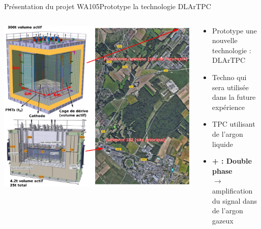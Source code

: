     \begin{frame}{Présentation du projet WA105}{Prototype la technologie DLArTPC}
        \begin{scriptsize}
            \begin{columns}
                \begin{column}{0.75\textwidth}
                    \centering
                    \includegraphics[height=0.9\textheight]{./pictures/wa105.png}
                \end{column}
                \begin{column}{0.25\textwidth}
                    \begin{itemize}
                        \item Prototype une nouvelle technologie : DLArTPC
                        \item Techno qui sera utilisée dans la future expérience \dune{} 
                        \item TPC utilisant de l'argon liquide
                        \item \textbf{+ : Double phase} \\$\to$ amplification du signal dans de l'argon gazeux
                    \end{itemize}
                \end{column}
            \end{columns}
        \end{scriptsize}
    \end{frame}

